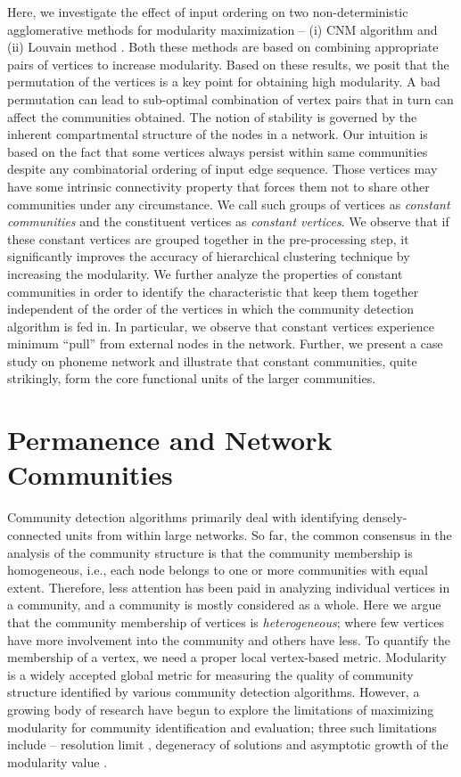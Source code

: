 Here, we investigate the effect of input ordering on two non-deterministic agglomerative methods for modularity maximization -- (i) CNM
algorithm \cite{cnm2004} and (ii) Louvain method \cite{bgll2008}. Both these methods are based on combining appropriate pairs of vertices to
increase modularity. Based on these results, we posit that the permutation of the vertices is a key point for obtaining high modularity. A
bad
permutation can lead to sub-optimal combination of vertex pairs that in turn can affect the communities obtained. The notion of stability is
governed by the inherent compartmental structure of the nodes in a network. Our intuition is based on the fact that some vertices always
persist within same communities despite any combinatorial ordering of input edge sequence. Those vertices may have some intrinsic
connectivity property that forces them not to share other communities under any circumstance. We call such groups of vertices as {\em
constant communities} and the constituent vertices as {\em constant vertices}. We observe that if these constant vertices are grouped
together in the pre-processing step, it significantly improves the accuracy of hierarchical clustering technique by increasing the
modularity. We further analyze the properties of constant communities in order to identify the characteristic that keep them together
independent of the order of the vertices in which the community detection algorithm is fed in. In particular, we observe that
constant vertices experience minimum ``pull'' from external nodes in the network. Further, we present a case study on phoneme network and
illustrate that constant communities, quite strikingly, form the core functional units of the larger communities.

\section{Permanence and Network Communities}
Community detection algorithms primarily deal with identifying densely-connected units from within large networks. So far, the common
consensus in the analysis of the community structure  is that the community membership is homogeneous, i.e., each node belongs to one or
more communities with equal extent. Therefore, less attention has been paid in analyzing individual vertices in a community, and a community
is mostly considered as a whole. Here we argue that the community membership of vertices is {\em heterogeneous}; where few vertices have
more involvement into the community and others have less. To quantify the membership of a vertex, we need a proper local vertex-based
metric. 
Modularity is a widely  accepted global metric for measuring the quality of community structure identified by various community detection
algorithms. However, a growing body of research have begun to explore the limitations of maximizing modularity for community identification
and evaluation; three such limitations include -- resolution limit \cite{Fortunato:2007}, degeneracy of solutions \cite{gmc2010} and
asymptotic growth of the modularity value \cite{gmc2010}. 

